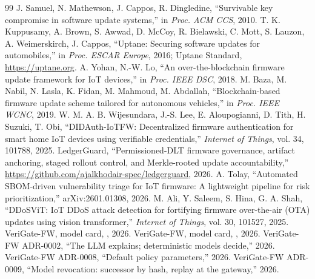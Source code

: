 \documentclass[conference]{IEEEtran}
\newcommand{\sys}{VeriGate-FW}
\begin{document}
\begin{thebibliography}{99}
 J. Samuel, N. Mathewson, J. Cappos, R. Dingledine, ``Survivable key compromise in
software update systems,'' in \emph{Proc. ACM CCS}, 2010.
 T. K. Kuppusamy, A. Brown, S. Awwad, D. McCoy, R. Bielawski, C. Mott, S. Lauzon,
A. Weimerskirch, J. Cappos, ``Uptane: Securing software updates for automobiles,'' in \emph{Proc.
ESCAR Europe}, 2016; Uptane Standard, \url{https://uptane.org}.
 A. Yohan, N.-W. Lo, ``An over-the-blockchain firmware update framework for IoT
devices,'' in \emph{Proc. IEEE DSC}, 2018.
 M. Baza, M. Nabil, N. Lasla, K. Fidan, M. Mahmoud, M. Abdallah, ``Blockchain-based
firmware update scheme tailored for autonomous vehicles,'' in \emph{Proc. IEEE WCNC}, 2019.
 W. M. A. B. Wijesundara, J.-S. Lee, E. Aloupogianni, D. Tith, H. Suzuki, T. Obi,
``DIDAuth-IoTFW: Decentralized firmware authentication for smart home IoT devices using
verifiable credentials,'' \emph{Internet of Things}, vol. 34, 101788, 2025.
 LedgerGuard, ``Permissioned-DLT firmware governance, artifact anchoring,
staged rollout control, and Merkle-rooted update accountability,''
\url{https://github.com/ajalkhodair-spec/ledgerguard}, 2026.
 A. Tolay, ``Automated SBOM-driven vulnerability triage for IoT firmware: A
lightweight pipeline for risk prioritization,'' arXiv:2601.01308, 2026.
 M. Ali, Y. Saleem, S. Hina, G. A. Shah, ``DDoSViT: IoT DDoS attack detection
for fortifying firmware over-the-air (OTA) updates using vision transformer,'' \emph{Internet of
Things}, vol. 30, 101527, 2025.
 \sys{}, model card, , 2026.
 \sys{}, model card, , 2026.
 \sys{} ADR-0002, ``The LLM explains; deterministic models decide,'' 2026.
 \sys{} ADR-0008, ``Default policy parameters,'' 2026.
 \sys{} ADR-0009, ``Model revocation: successor by hash, replay at the gateway,'' 2026.
\end{thebibliography}
\end{document}
